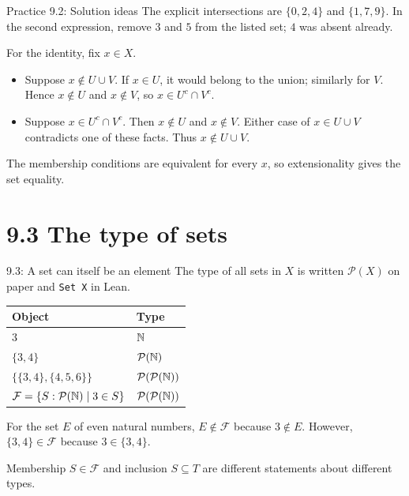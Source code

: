 \begin{frame}{Practice 9.2: Solution ideas}
The explicit intersections are $\{0,2,4\}$ and $\{1,7,9\}$.
In the second expression, remove $3$ and $5$ from the listed set; $4$ was absent already.
\medskip

For the identity, fix $x\in X$.
\begin{itemize}
\item Suppose $x\notin U\cup V$. If $x\in U$, it would belong to the union;
similarly for $V$. Hence $x\notin U$ and $x\notin V$, so $x\in U^c\cap V^c$.
\item Suppose $x\in U^c\cap V^c$. Then $x\notin U$ and $x\notin V$.
Either case of $x\in U\cup V$ contradicts one of these facts.
Thus $x\notin U\cup V$.
\end{itemize}
The membership conditions are equivalent for every $x$, so extensionality gives the set equality.
\end{frame}

\section{9.3 The type of sets}
\begin{frame}{9.3: A set can itself be an element}
The type of all sets in $X$ is written $\mathcal P(X)$ on paper and \texttt{Set X} in Lean.
\begin{center}
\begin{tabular}{ll}
\toprule
Object & Type\\\midrule
$3$ & $\mathbb{N}$\\
$\{3,4\}$ & $\mathcal P(\mathbb{N})$\\
$\{\{3,4\},\{4,5,6\}\}$ & $\mathcal P(\mathcal P(\mathbb{N}))$\\
$\mathcal F=\{S:\mathcal P(\mathbb{N})\mid3\in S\}$ & $\mathcal P(\mathcal P(\mathbb{N}))$\\
\bottomrule
\end{tabular}
\end{center}
For the set $E$ of even natural numbers, $E\notin\mathcal F$ because $3\notin E$.
However, $\{3,4\}\in\mathcal F$ because $3\in\{3,4\}$.
\medskip

Membership $S\in\mathcal F$ and inclusion $S\subseteq T$ are different statements about different types.
\end{frame}

